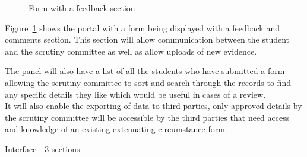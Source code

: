 \documentclass[../main.tex]{subfiles}
\begin{document}
	\begin{figure}[H]
        \caption{\label{fig:formandfeedback} Form with a feedback section}
      \end{figure}
      
Figure~\ref{fig:formandfeedback} shows the portal with a form being displayed with a feedback and comments section. This section will allow communication between the student and the scrutiny committee as well as allow uploads of new evidence. 

The panel will also have a list of all the students who have submitted a form allowing the scrutiny committee to sort and search through the records to find any specific details they like which would be useful in cases of a review.\\[2mm]

It will also enable the exporting of data to third parties, only approved details by the scrutiny committee will be accessible by the third parties that need access and knowledge of an existing extenuating circumstance form.


Interface - 3 sections
\end{document}
